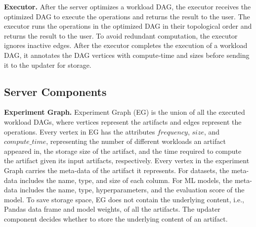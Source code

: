 \textbf{Executor. }
After the server optimizes a workload DAG, the executor receives the optimized DAG to execute the operations and returns the result to the user.
The executor runs the operations in the optimized DAG in their topological order and returns the result to the user.
To avoid redundant computation, the executor ignores inactive edges.
After the executor completes the execution of a workload DAG, it annotates the DAG vertices with compute-time and sizes before sending it to the updater for storage.

%

\subsection{Server Components}
\textbf{Experiment Graph.}
Experiment Graph (EG) is the union of all the executed workload DAGs, where vertices represent the artifacts and edges represent the operations.
Every vertex in EG has the attributes $frequency$, $size$, and $compute\_time$, representing the number of different workloads an artifact appeared in, the storage size of the artifact, and the time required to compute the artifact given its input artifacts, respectively.
Every vertex in the experiment Graph carries the meta-data of the artifact it represents.
For datasets, the meta-data includes the name, type, and size of each column.
For ML models, the meta-data includes the name, type, hyperparameters, and the evaluation score of the model.
To save storage space, EG does not contain the underlying content, i.e., Pandas data frame and model weights, of all the artifacts.
The updater component decides whether to store the underlying content of an artifact.

